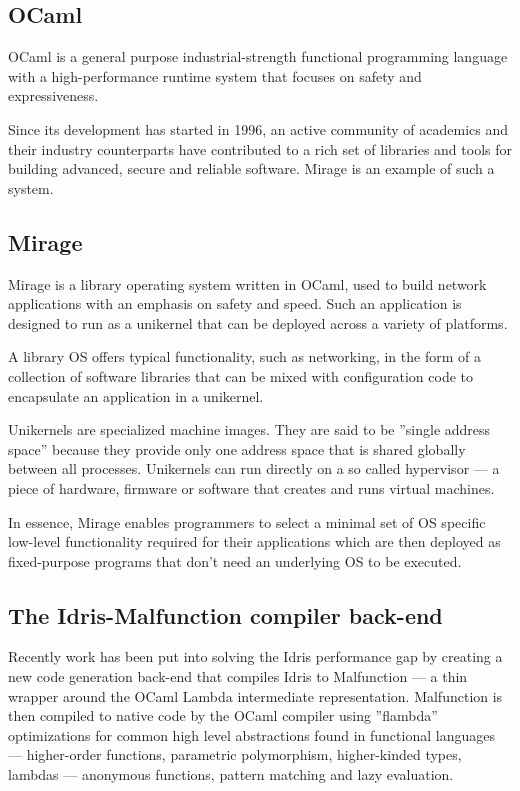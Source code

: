 \documentclass[a4paper]{report}
\begin{document}
\subsection{OCaml}
OCaml is a general purpose industrial-strength functional programming language
with a high-performance runtime system that focuses on safety and
expressiveness.

Since its development has started in 1996, an active community of
academics and their industry counterparts have contributed to a rich set of
libraries and tools for building advanced, secure and reliable software. Mirage
is an example of such a system.

\subsection{Mirage}
Mirage is a library operating system written in OCaml, used to build network
applications with an emphasis on safety and speed.
Such an application is designed to run as a unikernel that can be deployed
across a variety of platforms.

A library OS offers typical functionality, such as networking,
in the form of a collection of software libraries that can be mixed with
configuration code to encapsulate an application in a unikernel.

Unikernels are specialized machine images.
They are said to be ''single address space'' because they provide only one
address space that is shared globally between all processes.
Unikernels can run directly on a so called hypervisor --- a piece of hardware,
firmware or software that creates and runs virtual machines.

In essence, Mirage enables programmers to select a minimal set of OS specific
low-level functionality required for their applications which are then deployed
as fixed-purpose programs that don't need an underlying OS to be executed.

\subsection{The Idris-Malfunction compiler back-end}
Recently work has been put into solving the Idris performance gap by creating a
new code generation back-end that compiles Idris to Malfunction --- a thin
wrapper around the OCaml Lambda intermediate representation.
Malfunction is then compiled to native code by the OCaml compiler using
''flambda'' optimizations for common high level abstractions found in functional languages --- higher-order functions, parametric polymorphism,
higher-kinded types, lambdas --- anonymous functions, pattern matching and
lazy evaluation.
\end{document}

